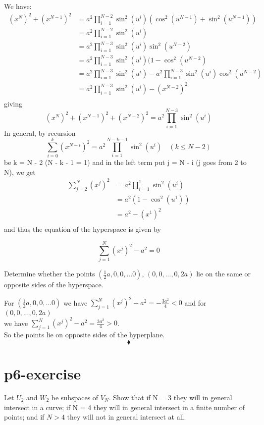 We have:
\begin{align*}
\ (x^N)^2 + (x^{N-1})^2 &= a^2\prod_{i=1}^{N-2}\sin^2(u^i)(\cos^2(u^{N-1})+\sin^2(u^{N-1}))  \\
\ &= a^2\prod_{i=1}^{N-2}\sin^2(u^i)\\
\ &= a^2\prod_{i=1}^{N-3}\sin^2(u^i)\sin^2(u^{N-2})\\
\ &= a^2\prod_{i=1}^{N-3}\sin^2(u^i)(1-\cos^2(u^{N-2})\\
\ &= a^2\prod_{i=1}^{N-3}\sin^2(u^i) - a^2\prod_{i=1}^{N-3}\sin^2(u^i)\cos^2(u^{N-2})\\
\ &= a^2\prod_{i=1}^{N-3}\sin^2(u^i) - (x^{N-2})^2\\
\end{align*}
giving
$$(x^N)^2 + (x^{N-1})^2 + (x^{N-2})^2 = a^2\prod_{i=1}^{N-3}\sin^2(u^i)$$
In general, by recursion
$$\sum_{i=0}^k(x^{N-i})^2 = a^2\prod_{i=1}^{N-k-1}\sin^2(u^i)     \quad (k \leq N-2)$$
be k = N - 2 (N - k - 1 = 1) and in the left term put j = N - i (j goes from 2 to N), we get
\begin{align*}
\sum_{j=2}^N(x^{j})^2 &= a^2\prod_{i=1}^{1}\sin^2(u^i)\\
\ &= a^2(1-\cos^2(u^1))\\
\ &= a^2 - (x^1)^2\\
\end{align*}
and thus the equation of the hyperspace is given by
\begin{LARGE}
\textbf{
$$\sum_{j=1}^N(x^{j})^2 - a^2 = 0$$
}
\end{LARGE}
\begin{tcolorbox}

Determine whether the points $(\frac{1}{2}a,0,0,... 0)$, $(0,0,...,0, 2a)$ lie on the same or opposite sides of the hyperspace.
\end{tcolorbox}
For $(\frac{1}{2}a,0,0,... 0)$ we have $\sum_{j=1}^N(x^{j})^2 - a^2 = -\frac{3a^2}{4} < 0$ and for 
$(0,0,...,0, 2a)$ \\we have $\sum_{j=1}^N(x^{j})^2 - a^2 = \frac{3a^2}{4} > 0$.\\
So the points lie on opposite sides of the hyperplane.
$$\blacklozenge$$
\pagebreak[4]

\section{p6-exercise}

\begin{tcolorbox}

Let $U_2$ and $W_2$ be subspaces of $V_N$. Show that if N = 3  they will in general intersect in a curve; if N = 4 they will in general intersect in a finite number of points; and if $N > 4$ they will not in general intersect at all.
\end{tcolorbox}

